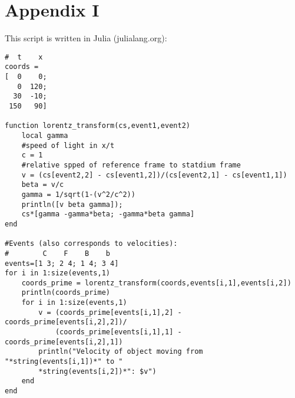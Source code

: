 \section*{Appendix I}
This script is written in Julia (julialang.org):
\begin{verbatim}
#  t    x
coords =
[  0    0;
   0  120;
  30  -10;
 150   90]

function lorentz_transform(cs,event1,event2)
    local gamma
    #speed of light in x/t
    c = 1
    #relative spped of reference frame to statdium frame
    v = (cs[event2,2] - cs[event1,2])/(cs[event2,1] - cs[event1,1])
    beta = v/c
    gamma = 1/sqrt(1-(v^2/c^2))
    println([v beta gamma]);
    cs*[gamma -gamma*beta; -gamma*beta gamma]
end

#Events (also corresponds to velocities):
#        C    F    B    b
events=[1 3; 2 4; 1 4; 3 4]
for i in 1:size(events,1)
    coords_prime = lorentz_transform(coords,events[i,1],events[i,2])
    println(coords_prime)
    for i in 1:size(events,1)
        v = (coords_prime[events[i,1],2] - coords_prime[events[i,2],2])/
            (coords_prime[events[i,1],1] - coords_prime[events[i,2],1])
        println("Velocity of object moving from "*string(events[i,1])*" to "
        *string(events[i,2])*": $v")
    end
end
\end{verbatim}
